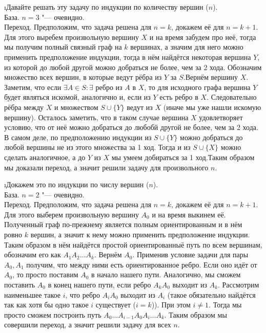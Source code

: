 \i Давайте решать эту задачу по индукции по количеству вершин ($n$).\\
База. $n=3$ "--- очевидно.\\
Переход. Предположим, что задача решена для $n=k$, докажем её для $n=k+1$. Для этого выребем произвольную вершину $X$ и на время забудем про неё, тогда мы получим полный связный граф на $k$ вершинах, а значим для него можно применить предположение индукции, тогда в нём найдётся некоторая вершина $Y$, из которой до любой другой можно добраться не более, чем за 2 хода. Обозначим множество всех вершин, в которые ведут рёбра из $Y$ за $S$.Вернём вершину $X$. Заметим, что если $\exists A \in S: \exists$ ребро из $A$ в $X$, то для исходного графа вершина $Y$ будет являться искомой, аналогично и, если из $Y$ есть ребро в $X$. Следовательно рёбра между $X$ и множеством $S \cup \{Y\}$ ведут из $X$ (иначе мы уже нашли искомую вершину). Осталось заметить, что в таком случае вершина $X$ удовлетворяет условию, что от неё можно добраться до любобй другой не более, чем за 2 хода. В самом деле, по предположению индукции из $S \cup \{Y\}$ можно добраться до любой вершины не из этого множества за 1 ход. Тогда и из $S \cup \{X\}$ можно сделать аналогичное, а до $Y$ из $X$ мы умеем добираться за 1 ход.Таким образом мы доказали переход, а значит решили задачу для произвольного $n$.

\i Докажем это по индукции по числу вершин ($n$).\\
База. $n = 2$ "--- очевидно.\\
Переход. Предположим, что задача решена для $n=k$, докажем её для $n=k+1$. Для этого выберем произвольную вершину $A_0$ и на время выкинем её. Полученный граф по-прежнему является полным ориентированным и в нём ровно $k$ вершин, а значит к нему можно применить предположение индукции. Таким образом в нём найдётся простой ориентированныё путь по всем вершинам, обозначим его как $A_1 A_2 \ldots A_k$. Вернём $A_0$. Применив условие задачи для пары $A_0, A_1$ получим, что между ними есть ориентированное ребро. Если оно идёт от $A_0$, то просто поставим $A_0$ в начало нашего пути. Аналогично, мы сможем поставить $A_0$ в конец нашего пути, если ребро $A_kA_0$ выходит из $A_k$. Рассмотрим наименьшее такое $i$, что ребро $A_iA_0$ выходит из $A_i$ (такое обязательно найдётся так как хотя бы одно такое $i$ существует ($i=k$)). При этом $i \ne 1$. Тогда мы просто сможем построить путь $A_0 \ldots A_{i-1} A_0 A_i \ldots A_k$. Таким образом мы совершили переход, а значит решили задачу для всех $n$.

